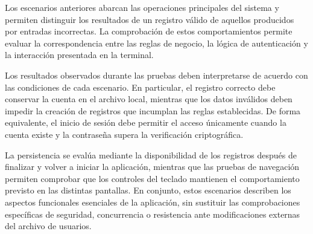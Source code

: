 Los escenarios anteriores abarcan las operaciones principales del sistema y permiten distinguir los resultados de un registro válido de aquellos producidos por entradas incorrectas.
La comprobación de estos comportamientos permite evaluar la correspondencia entre las reglas de negocio, la lógica de autenticación y la interacción presentada en la terminal.

Los resultados observados durante las pruebas deben interpretarse de acuerdo con las condiciones de cada escenario.
En particular, el registro correcto debe conservar la cuenta en el archivo local, mientras que los datos inválidos deben impedir la creación de registros que incumplan las reglas establecidas.
De forma equivalente, el inicio de sesión debe permitir el acceso únicamente cuando la cuenta existe y la contraseña supera la verificación criptográfica.

La persistencia se evalúa mediante la disponibilidad de los registros después de finalizar y volver a iniciar la aplicación, mientras que las pruebas de navegación permiten comprobar que los controles del teclado mantienen el comportamiento previsto en las distintas pantallas.
En conjunto, estos escenarios describen los aspectos funcionales esenciales de la aplicación, sin sustituir las comprobaciones específicas de seguridad, concurrencia o resistencia ante modificaciones externas del archivo de usuarios.
